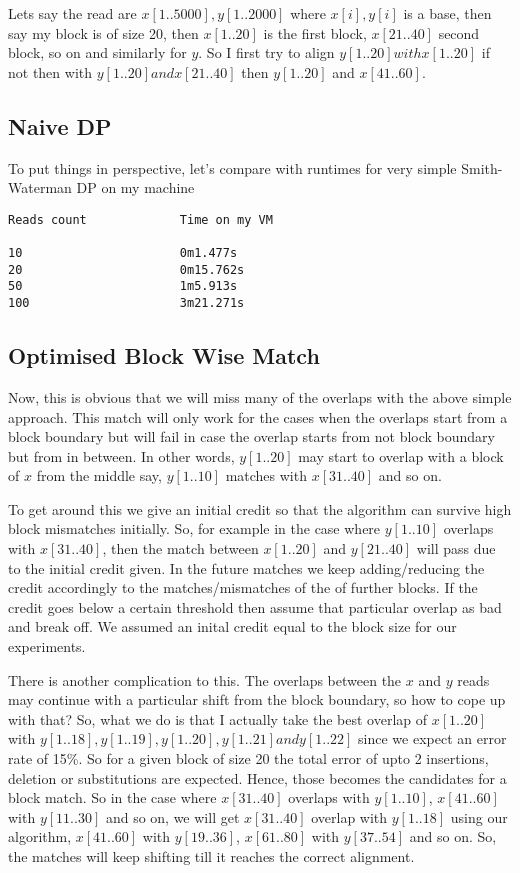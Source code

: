 \documentclass{article}
\begin{document}
            Lets say the read are $x[1..5000], y[1..2000]$ where $x[i], y[i]$ is a base, then say my block is of size 20, then $x[1..20]$ is the first block, $x[21..40]$ second block, so on and similarly for $y$. So I first try to align $y[1..20] with x[1..20]$ if not then with $y[1..20] and x[21..40]$ then $y[1..20]$ and $x[41..60]$.
            
        \subsection{Naive DP}
        
            To put things in perspective, let’s compare with runtimes for very simple Smith-Waterman DP on my machine
            
\begin{verbatim}
Reads count             Time on my VM

10                      0m1.477s
20                      0m15.762s
50                      1m5.913s
100                     3m21.271s
\end{verbatim}

        \subsection{Optimised Block Wise Match}
            
            Now, this is obvious that we will miss many of the overlaps with the above simple approach. This match will only work for the cases when the overlaps start from a block boundary but will fail in case the overlap starts from not block boundary but from in between. In other words, $y[1..20]$ may start to overlap with a block of $x$ from the middle say, $y[1..10]$ matches with $x[31..40]$ and so on.
            
            To get around this we give an initial credit so that the algorithm can survive high block mismatches initially. So, for example in the case where $y[1..10]$ overlaps with $x[31..40]$, then the match between $x[1..20]$ and $y[21..40]$ will pass due to the initial credit given. In the future matches we keep adding/reducing the credit accordingly to the matches/mismatches of the of further blocks. If the credit goes below a certain threshold then assume that particular overlap as bad and break off. We assumed an inital credit equal to the block size for our experiments.

            There is another complication to this. The overlaps between the $x$ and $y$ reads may continue with a particular shift from the block boundary, so how to cope up with that? So, what we do is that I actually take the best overlap of $x[1..20]$ with $y[1..18], y[1..19], y[1..20], y[1..21] and y[1..22]$ since we expect an error rate of 15\%. So for a given block of size 20 the total error of upto 2 insertions, deletion or substitutions are expected. Hence, those becomes the candidates for a block match. So in the case where $x[31..40]$ overlaps with $y[1..10]$, $x[41..60]$ with $y[11..30]$ and so on, we will get $x[31..40]$ overlap with $y[1..18]$ using our algorithm, $x[41..60]$ with $y[19..36]$, $x[61..80]$ with $y[37..54]$ and so on. So, the matches will keep shifting till it reaches the correct alignment.
\end{document}
